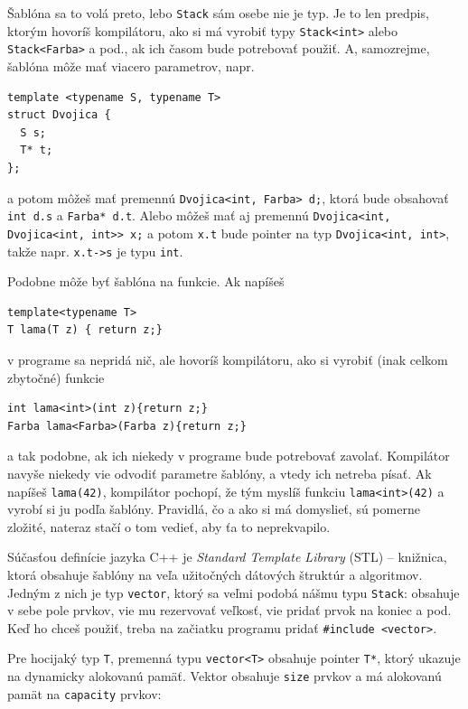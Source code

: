 \documentclass[10pt]{article}
\def\prg{\lstinline}
\def\ods{\vspace*{10pt}}
\begin{document}
\ods
Šablóna sa to volá preto, lebo {\tt Stack} sám osebe nie je typ. Je to len predpis,
ktorým hovoríš kompilátoru, ako si má vyrobiť typy \prg!Stack<int>! alebo
\prg!Stack<Farba>!
a pod., ak ich časom bude potrebovať použiť. 
A, samozrejme, šablóna môže mať viacero parametrov,
napr.

\begin{lstlisting}
template <typename S, typename T>
struct Dvojica {
  S s;
  T* t;
};
\end{lstlisting}

a potom môžeš mať premennú \prg!Dvojica<int, Farba> d;!, ktorá bude obsahovať
\prg!int d.s! a \prg!Farba* d.t!. Alebo 
môžeš mať aj premennú \prg!Dvojica<int, Dvojica<int, int>> x;! a potom
{\tt x.t} bude pointer na typ \prg!Dvojica<int, int>!, takže napr.
\prg!x.t->s! je typu \prg!int!.

\ods
Podobne môže byť šablóna na funkcie. Ak napíšeš

\begin{lstlisting}
template<typename T>
T lama(T z) { return z;}
\end{lstlisting}

v programe sa nepridá nič, ale hovoríš kompilátoru, ako si vyrobiť (inak celkom
zbytočné) funkcie 

\begin{lstlisting}
int lama<int>(int z){return z;}
Farba lama<Farba>(Farba z){return z;}
\end{lstlisting}

a tak podobne, ak ich niekedy v programe bude potrebovať zavolať.
Kompilátor navyše niekedy vie odvodiť parametre šablóny, a vtedy ich 
netreba písať. Ak napíšeš \prg!lama(42)!, kompilátor pochopí, že tým myslíš
funkciu \prg!lama<int>(42)! a vyrobí si ju podľa šablóny. Pravidlá, čo a ako si má
domyslieť, sú pomerne zložité, nateraz stačí o tom vedieť, aby ťa to neprekvapilo.

\ods 
Súčasťou definície jazyka C++ je {\em Standard Template Library} (STL) -- knižnica, ktorá
obsahuje šablóny na veľa užitočných dátových štruktúr a algoritmov. Jedným z nich je typ
\prg!vector!, ktorý sa veľmi podobá nášmu typu {\tt Stack}: obsahuje v sebe pole prvkov,
vie mu rezervovať veľkosť, vie pridať prvok na koniec a pod. Keď ho chceš použiť,
treba na začiatku programu pridať \prg!#include <vector>!.

\ods Pre hocijaký typ \prg!T!, premenná typu \prg!vector<T>! obsahuje pointer \prg!T*!,
ktorý ukazuje na dynamicky alokovanú pamäť. Vektor obsahuje {\tt size} prvkov a
má alokovanú pamät na {\tt capacity} prvkov:
\end{document}
